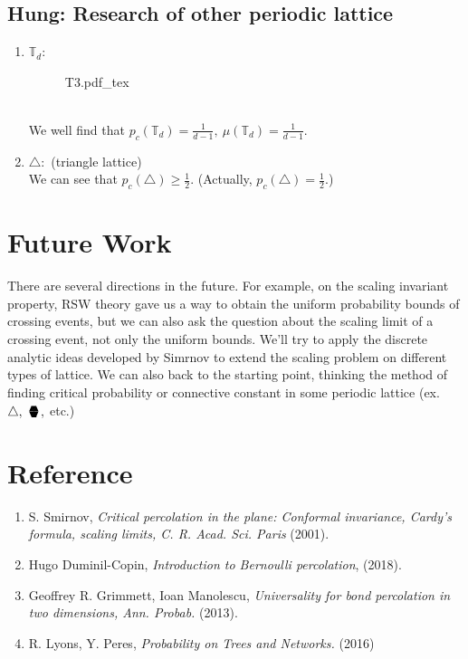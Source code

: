 \documentclass[12pt]{article}
\newcommand{\sixedge}{\mbox{\parbox[t][-2pt][c]{10pt}{\scriptsize$\blacktriangledown\hspace{-3.6pt}\blacktriangle\hspace{-4pt}\blacktriangledown$}\hspace{-10.2pt}\parbox[b][10.7pt][c]{10pt}{\scriptsize$\blacktriangle\hspace{-3.6pt}\blacktriangledown\hspace{-3.6pt}\blacktriangle$}}}
\theoremstyle{plane}
\theoremstyle{definition}
\newcommand{\inccfig}[1]{%
{#1.pdf_tex}
}
\begin{document}
\subsection{Hung: Research of other periodic lattice}
\begin{enumerate}
    \item $\mathbb{T}_d:$
	\begin{figure}[htp]
	\centering
	\def\svgwidth{7cm}
	\inccfig{T3}
	\end{figure}\\
	We well find that $p_c(\mathbb{T}_d)=\frac{1}{d-1},\ \mu(\mathbb{T}_d)=\frac{1}{d-1}.$
	\item $\triangle:$ (triangle lattice)\\[5pt]
	We can see that $p_c(\triangle)\geq \frac{1}{2}.$ (Actually, $p_c(\triangle)=\frac{1}{2}.$)
\end{enumerate}

\section{Future Work}

There are several directions in the future. For example, on the scaling invariant property, RSW theory gave us a way to obtain the uniform probability bounds of crossing events, but we can also ask the question about the scaling limit of a crossing event, not only the uniform bounds. We'll try to apply the discrete analytic ideas developed by Simrnov to extend the scaling problem on different types of lattice.
We can also back to the starting point, thinking the method of finding critical probability or connective constant in some periodic lattice (ex. $\triangle,\ \sixedge,$ etc.) 

\section*{Reference}

\begin{enumerate}
\item S. Smirnov, \textit{Critical percolation in the plane: Conformal invariance, Cardy's formula, scaling limits, C. R. Acad. Sci. Paris} (2001).
\item Hugo Duminil-Copin, \textit{Introduction to Bernoulli percolation}, (2018).
\item Geoffrey R. Grimmett, Ioan Manolescu, \textit{Universality for bond percolation in two dimensions, Ann. Probab.} (2013).
\item R. Lyons, Y. Peres, \textit{Probability on Trees and Networks.} (2016)
\end{enumerate}
\end{document}
